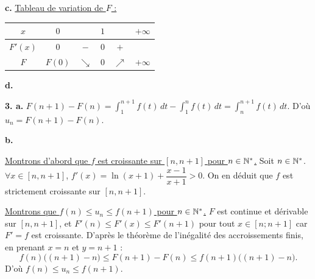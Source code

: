 \documentclass[11pt]{article}
\begin{document}
\textbf{c.} \underline{Tableau de variation de $F$ :}
\begin{center}\renewcommand{\arraystretch}{1.4}
\begin{tabular}{|c|ccccc|}
\hline
$x$ & $0$ & & $1$ & & $+\infty$ \\
\hline
$F'(x)$ & $0$ & $-$ & $0$ & $+$ & \\
\hline
$F$ & $F(0)$ & $\searrow$ & $0$ & $\nearrow$ & $+\infty$ \\
\hline
\end{tabular}
\end{center}

\textbf{d.} \begin{center}
\end{center}

\textbf{3. a.} $F(n+1) - F(n) = \displaystyle\int_1^{n+1} f(t)\,dt - \int_1^n f(t)\,dt = \int_n^{n+1} f(t)\,dt$. D'où $u_n = F(n+1) - F(n)$.

\textbf{b.}

\underline{Montrons d'abord que $f$ est croissante sur $[n, n+1]$ pour $n \in \mathbb{N}^*$.} Soit $n \in \mathbb{N}^*$. $\forall x \in [n, n+1]$, $f'(x) = \ln(x+1) + \dfrac{x-1}{x+1} > 0$. On en déduit que $f$ est strictement croissante sur $[n, n+1]$.

\underline{Montrons que $f(n) \le u_n \le f(n+1)$ pour $n \in \mathbb{N}^*$.} $F$ est continue et dérivable sur $[n, n+1]$, et $F'(n) \le F'(x) \le F'(n+1)$ pour tout $x \in [n;n+1]$ car $F' = f$ est croissante. D'après le théorème de l'inégalité des accroissements finis, en prenant $x = n$ et $y = n+1$ :
\[ f(n)\big((n+1) - n\big) \le F(n+1) - F(n) \le f(n+1)\big((n+1) - n\big). \]
D'où $f(n) \le u_n \le f(n+1)$.
\end{document}
